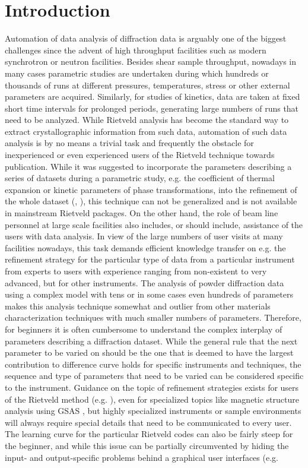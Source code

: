 \chapter{Introduction}

Automation of data analysis of diffraction data is arguably one of the biggest challenges since the advent of high throughput facilities such as modern synchrotron or neutron facilities. Besides shear sample throughput, nowadays in many cases parametric studies are undertaken during which hundreds or thousands of runs at different pressures, temperatures, stress or other external parameters are acquired. Similarly, for studies of kinetics, data are taken at fixed short time intervals for prolonged periods, generating large numbers of runs that need to be analyzed. While Rietveld analysis \cite{rietveld1969profile,young1996rietveld} has become the standard way to extract crystallographic information from such data, automation of such data analysis is by no means a trivial task and frequently the obstacle for inexperienced or even experienced users of the Rietveld technique towards publication. While it was suggested to incorporate the parameters describing a series of datasets during a parametric study, e.g. the coefficient of thermal expansion or kinetic parameters of phase transformations, into the refinement of the whole dataset (\cite{stinton2007parametric}, \cite{halasz2010parametric}), this technique can not be generalized and is not available in mainstream Rietveld packages. On the other hand, the role of beam line personnel at large scale facilities also includes, or should include, assistance of the users with data analysis. In view of the large numbers of user visits at many facilities nowadays, this task demands efficient knowledge transfer on e.g. the refinement strategy for the particular type of data from a particular instrument from experts to users with experience ranging from non-existent to very advanced, but for other instruments. The analysis of powder diffraction data using a complex model with tens or in some cases even hundreds of parameters makes this analysis technique somewhat and outlier from other materials characterization techniques with much smaller numbers of parameters. Therefore, for beginners it is often cumbersome to understand the complex interplay of parameters describing a diffraction dataset. While the general rule that the next parameter to be varied on should be the one that is deemed to have the largest contribution to difference curve holds for specific instruments and techniques, the sequence and type of parameters that need to be varied can be considered specific to the instrument. Guidance on the topic of refinement strategies exists for users of the Rietveld method (e.g. \cite{mccusker1999rietveld}), even for specialized topics like magnetic structure analysis using GSAS \cite{cui2006magnetic}, but highly specialized instruments or sample environments will always require special details that need to be communicated to every user. The learning curve for the particular Rietveld codes can also be fairly steep for the beginner, and while this issue can be partially circumvented by hiding the input- and output-specific problems behind a graphical user interfaces (e.g. 